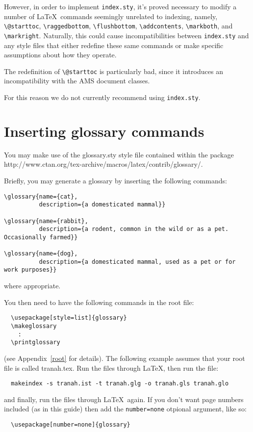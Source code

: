 However, in order to implement \verb"index.sty", it's proved necessary to
modify a number of \LaTeX\ commands seemingly unrelated to indexing,
namely, \verb"\@starttoc", \verb"\raggedbottom", \verb"\flushbottom",
\verb"\addcontents", \verb"\markboth", and \verb"\markright".
Naturally, this could cause incompatibilities between \texttt{index.sty}
and any style files that either redefine these same commands or
make specific assumptions about how they operate.

The redefinition of \verb"\@starttoc" is particularly bad,
since it introduces an incompatibility with the AMS document classes.

For this reason we do not currently recommend using \verb"index.sty".

\enlargethispage{14pt}
\section{Inserting glossary commands}\label{glossary}

You may make use of the glossary.sty style file contained 
within the package http://www.ctan.org/tex-archive/macros/latex/contrib/glossary/.

Briefly, 
you may generate a glossary by inserting the following commands:
%
\begin{verbatim}
\glossary{name={cat},
          description={a domesticated mammal}}

\glossary{name={rabbit},
          description={a rodent, common in the wild or as a pet. Occasionally farmed}}

\glossary{name={dog},
          description={a domesticated mammal, used as a pet or for work purposes}}
\end{verbatim}
where appropriate.
%



You then need to have the following commands in the root file:
\begin{verbatim}
  \usepackage[style=list]{glossary}
  \makeglossary
    :
  \printglossary
\end{verbatim}
(see Appendix~\ref{root} for details). The following example assumes that your 
root file is called tranah.tex. Run the files through \LaTeX, then run the file:
\begin{verbatim}
  makeindex -s tranah.ist -t tranah.glg -o tranah.gls tranah.glo
\end{verbatim}
and finally, run the files through \LaTeX\ again. If you don't want page numbers included (as in this guide)
then add the \verb"number=none" otpional argument, like so:
\begin{verbatim}
  \usepackage[number=none]{glossary}
\end{verbatim}

\endinput
